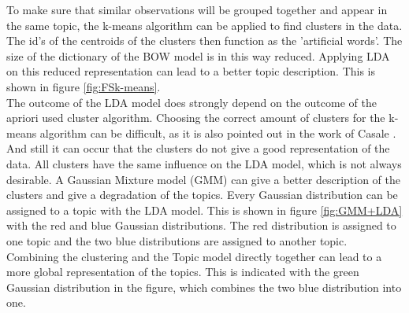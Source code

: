 To make sure that similar observations will be grouped together and appear in the same topic, the k-means algorithm can be applied to find clusters in the data. The id's of the centroids of the clusters then function as the 'artificial words'. The size of the dictionary of the BOW model is in this way reduced. Applying LDA on this reduced representation can lead to a better topic description. This is shown in figure \ref{fig:FSk-means}.\\
The outcome of the LDA model does strongly depend on the outcome of the apriori used cluster algorithm. Choosing the correct amount of clusters for the k-means algorithm can be difficult, as it is also pointed out in the work of Casale \cite{Casale:2009}. And still it can occur that the clusters do not give a good representation of the data. All clusters have the same influence on the LDA model, which is not always desirable. A Gaussian Mixture model (GMM) can give a better description of the clusters and give a degradation of the topics. Every Gaussian distribution can be assigned to a topic with the LDA model. This is shown in figure \ref{fig:GMM+LDA} with the red and blue Gaussian distributions. The red distribution is assigned to one topic and the two blue distributions are assigned to another topic.\\
Combining the clustering and the Topic model directly together can lead to a more global representation of the topics. This is indicated with the green Gaussian distribution in the figure, which combines the two blue distribution into one. 



 

% 


